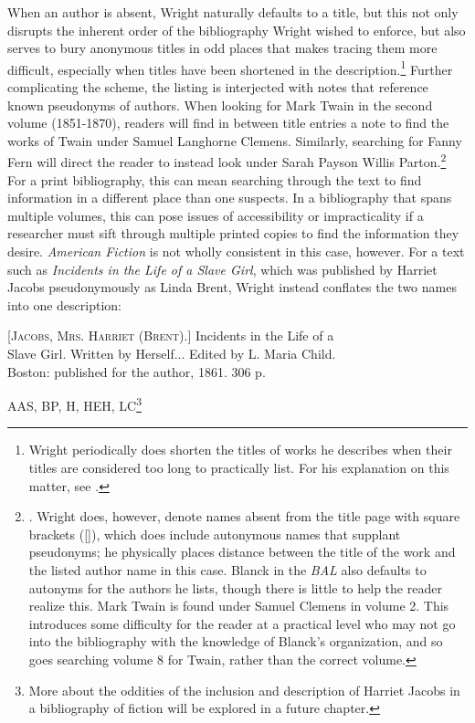 When an author is absent, Wright naturally defaults to a title, but this not only disrupts the inherent order of the bibliography Wright wished to enforce, but also serves to bury anonymous titles in odd places that makes tracing them more difficult, especially when titles have been shortened in the description.\footnote{Wright periodically does shorten the titles of works he describes when their titles are considered too long to practically list. For his explanation on this matter, see \autocite[ix]{wright_american_1939}.} Further complicating the scheme, the listing is interjected with notes that reference known pseudonyms of authors. When looking for Mark Twain in the second volume (1851-1870), readers will find in between title entries a note to find the works of Twain under Samuel Langhorne Clemens.\autocite[341]{wright_american_1957} Similarly, searching for Fanny Fern will direct the reader to instead look under Sarah Payson Willis Parton.\footnote{\autocite[120]{wright_american_1957}. Wright does, however, denote names absent from the title page with square brackets ([]), which does include autonymous names that supplant pseudonyms; he physically places distance between the title of the work and the listed author name in this case. Blanck in the \textit{BAL} also defaults to autonyms for the authors he lists, though there is little to help the reader realize this. Mark Twain is found under Samuel Clemens in volume 2. This introduces some difficulty for the reader at a practical level who may not go into the bibliography with the knowledge of Blanck's organization, and so goes searching volume 8 for Twain, rather than the correct volume.} For a print bibliography, this can mean searching through the text to find information in a different place than one suspects. In a bibliography that spans multiple volumes, this can pose issues of accessibility or impracticality if a researcher must sift through multiple printed copies to find the information they desire. \textit{American Fiction} is not wholly consistent in this case, however. For a text such as \textit{Incidents in the Life of a Slave Girl}, which was published by Harriet Jacobs pseudonymously as Linda Brent, Wright instead conflates the two names into one description: 

\begin{displayquote}
\textsc{[Jacobs, Mrs. Harriet (Brent).]} Incidents in the Life of a \\ \hspace*{1 pc} Slave Girl. Written by Herself... Edited by L. Maria Child. \\ \hspace*{1 pc} Boston: published for the author, 1861.  306 p.\begin{flushright}
\vspace*{-5mm} \textsc{AAS, BP, H, HEH, LC}\footnote{\autocite[179]{wright_american_1957} More about the oddities of the inclusion and description of Harriet Jacobs in a bibliography of fiction will be explored in a future chapter.}\end{flushright}
\end{displayquote}

